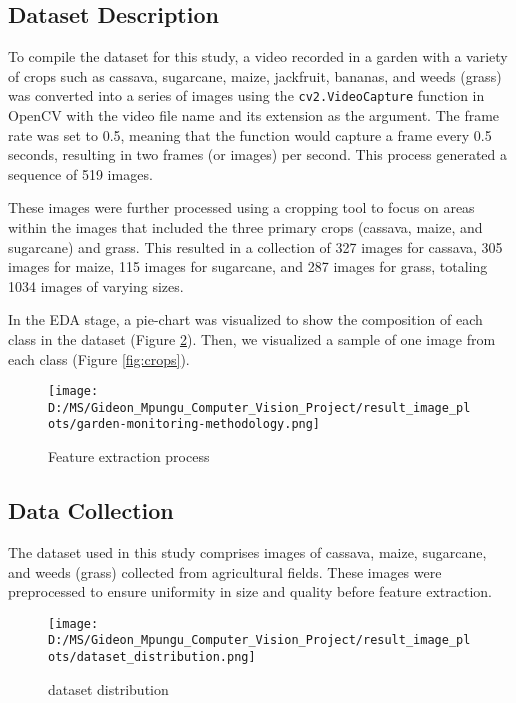 \documentclass[10pt,twocolumn,letterpaper]{article}
\begin{document}
\subsection{Dataset Description}

To compile the dataset for this study, a video recorded in a garden with a variety of crops such as cassava, sugarcane, maize, jackfruit, bananas, and weeds (grass) was converted into a series of images using the \texttt{cv2.VideoCapture} function in OpenCV with the video file name and its extension as the argument. The frame rate was set to 0.5, meaning that the function would capture a frame every 0.5 seconds, resulting in two frames (or images) per second. This process generated a sequence of 519 images.

These images were further processed using a cropping tool to focus on areas within the images that included the three primary crops (cassava, maize, and sugarcane) and grass. This resulted in a collection of 327 images for cassava, 305 images for maize, 115 images for sugarcane, and 287 images for grass, totaling 1034 images of varying sizes.

In the EDA stage, a pie-chart was visualized to show the composition of each class in the dataset (Figure \ref{fig:pie_chart}). Then, we visualized a sample of one image from each class (Figure \ref{fig:crops}).

\begin{figure}[h]
    \texttt{[image: D:/MS/Gideon\_Mpungu\_Computer\_Vision\_Project/result\_image\_plots/garden-monitoring-methodology.png]}
    \caption{Feature extraction process}
    \label{fig:feature_extraction}
\end{figure}

\subsection{Data Collection}
The dataset used in this study comprises images of cassava, maize, sugarcane, and weeds (grass) collected from agricultural fields. These images were preprocessed to ensure uniformity in size and quality before feature extraction.

\begin{figure}[h]
    \texttt{[image: D:/MS/Gideon\_Mpungu\_Computer\_Vision\_Project/result\_image\_plots/dataset\_distribution.png]}
    \caption{dataset distribution}
    \label{fig:pie_chart}
\end{figure}
\end{document}

